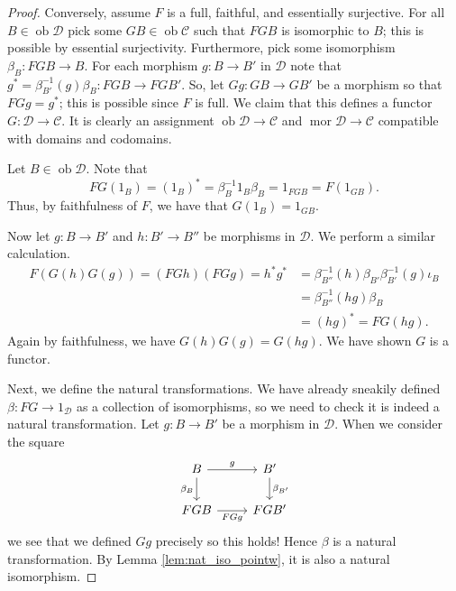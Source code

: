 \documentclass{report}
\DeclareMathOperator{\ob}{ob}
\DeclareMathOperator{\mor}{mor}
\theoremstyle{definition}
\theoremstyle{plain}
\theoremstyle{definition}
\begin{document}
\begin{proof}
		Conversely, assume $F$ is a full, faithful, and essentially surjective. For all $B\in \ob\mathcal{D}$ pick some $GB \in\ob \mathcal{C}$ such that $FGB$ is isomorphic to $B$; this is possible by essential surjectivity. Furthermore, pick some isomorphism $\beta_B\colon FGB\to B$. For each morphism $g\colon B \to B'$ in $\mathcal{D}$ note that $g^{*}=\beta_{B'}^{-1}(g)\beta_B \colon FGB \to FGB'$. So, let $Gg \colon GB \to GB'$ be a morphism so that $FGg = g^{*}$; this is possible since $F$ is full. We claim that this defines a functor $G\colon \mathcal{D} \to \mathcal{C}$. It is clearly an assignment $\ob \mathcal{D} \to \mathcal{C}$ and $\mor \mathcal{D} \to \mathcal{C}$ compatible with domains and codomains.
		
		Let $B\in\ob \mathcal{D}$. Note that 
		\[
			FG(1_B) = (1_B)^{*} = \beta_B^{-1} 1_B \beta_B = 1_{FGB} = F(1_{GB}).
		\]
		Thus, by faithfulness of $F$, we have that $G(1_B) = 1_{GB}$.
		
		Now let $g\colon B \to B'$ and $h\colon B' \to B''$ be morphisms in $\mathcal{D}$. We perform a similar calculation.
		\begin{align*}
			F(G(h)G(g)) = (FGh)(FGg) = h^{*}g^{*} &= \beta_{B''}^{-1}(h)\beta_{B'}\beta_{B'}^{-1}(g)\iota_B\\
			&=\beta_{B''}^{-1}(hg)\beta_B \\
			&= (hg)^{*} = FG(hg).
		\end{align*}
		Again by faithfulness, we have $G(h)G(g) = G(hg)$. We have shown $G$ is a functor.
		
		Next, we define the natural transformations. We have already sneakily defined $\beta \colon FG \to 1_{\mathcal{D}}$ as a collection of isomorphisms, so we need to check it is indeed a natural transformation. Let $g\colon B \to B'$ be a morphism in $\mathcal{D}$. When we consider the square
		\[\begin{tikzcd}
			B & {B'} \\
			FGB & {FGB'}
			\arrow["g", from=1-1, to=1-2]
			\arrow["FGg"', from=2-1, to=2-2]
			\arrow["{\beta_B}"', from=1-1, to=2-1]
			\arrow["{\beta_{B'}}", from=1-2, to=2-2]
		\end{tikzcd}\]
		we see that we defined $Gg$ precisely so this holds! Hence $\beta$ is a natural transformation. By Lemma \ref{lem:nat_iso_pointw}, it is also a natural isomorphism.
		

\end{proof}
\end{document}
